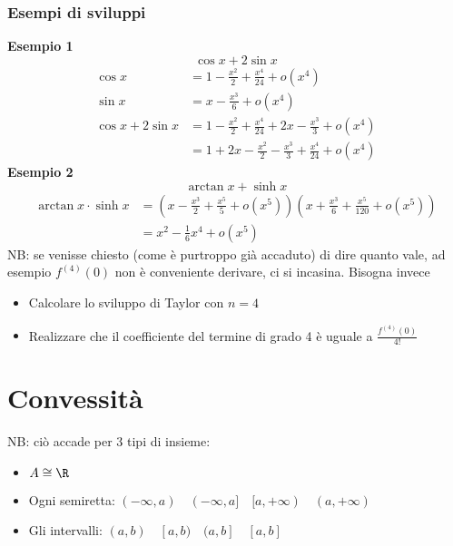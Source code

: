 \subsubsection{Esempi di sviluppi}
\textbf{Esempio 1}
\[
	\cos x + 2 \sin x
\]
\begin{align*}
	\cos x            & =  1-\frac{x^2}{2}+\frac{x^{4}}{24} + o\left( x^{4} \right)                           \\
	\sin x            & =  x - \frac{x^3}{6} + o \left( x^{4} \right)                                         \\
	\cos x + 2 \sin x & =  1 - \frac{x^2}{2} + \frac{x^{4}}{24} + 2x - \frac{x^3}{3} + o \left( x^{4} \right) \\
	                  & = 1 + 2x - \frac{x^2}{2} - \frac{x^3}{3} + \frac{x^{4}}{ 24} + o\left( x^{4} \right)
\end{align*}
\textbf{Esempio 2}
\[
	\arctan x + \sinh x
\]
\begin{align*}
	\arctan x \cdot \sinh x & = \left( x- \frac{x^3}{2} + \frac{x^{5}}{5} + o\left( x^{5} \right)  \right) \left( x + \frac{x^3}{6} + \frac{x^{5}}{120} + o \left( x^{5} \right)  \right) \\
	                        & = x^2 - \frac{1}{6}x^{4} + o\left( x^{5} \right)
\end{align*}
NB: se venisse chiesto (come è purtroppo già accaduto) di dire quanto vale, ad esempio $f^{\left( 4 \right) }\left( 0 \right) $ non è conveniente derivare, ci si incasina. Bisogna invece
\begin{itemize}
	\item Calcolare lo sviluppo di Taylor con $n=4$
	\item Realizzare che il coefficiente del termine di grado 4 è uguale a $\frac{f^{\left( 4 \right) }\left( 0 \right)}{4!} $
\end{itemize}

\section{Convessità}
NB: ciò accade per 3 tipi di insieme:
\begin{itemize}
	\item $A \cong \R$
	\item Ogni semiretta: $\left( -\infty, a \right) \quad (-\infty, a ]  \quad [a, + \infty) \quad \left( a,+ \infty \right) $
	\item Gli intervalli: $\left( a,b \right) \quad [a,b) \quad (a, b] \quad \left[ a,b \right] $
\end{itemize}

